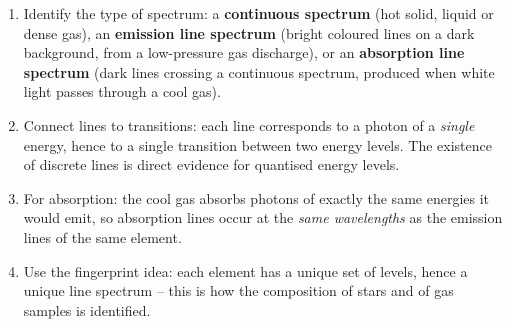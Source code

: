 \documentclass[11pt]{article}
\newcommand{\cle}[1]{{\popxbold\color{popdark}#1}}
\begin{document}
\begin{methode}
\begin{enumerate}
\item Identify the type of spectrum: a \textbf{continuous spectrum} (hot solid, liquid or dense gas), an \textbf{emission line spectrum} (bright coloured lines on a dark background, from a low-pressure gas discharge), or an \textbf{absorption line spectrum} (dark lines crossing a continuous spectrum, produced when white light passes through a cool gas).
\item Connect lines to transitions: each line corresponds to a photon of a \emph{single} energy, hence to a single transition between two energy levels. The existence of discrete lines is direct evidence for \cle{quantised energy levels}.
\item For absorption: the cool gas absorbs photons of exactly the same energies it would emit, so absorption lines occur at the \emph{same wavelengths} as the emission lines of the same element.
\item Use the fingerprint idea: each element has a unique set of levels, hence a unique line spectrum -- this is how the composition of stars and of gas samples is identified.
\end{enumerate}
\end{methode}
\end{document}
